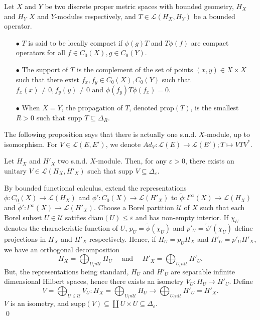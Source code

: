 \begin{definition}
Let $X$ and $Y$ be two discrete proper metric spaces with bounded geometry, $H_X$ and $H_Y$ $X$ and $Y$-modules respectively, and $T\in \mathcal L(H_X, H_Y)$ be a bounded operator.
\begin{itemize}
\item[$\bullet$] $T$ is said to be locally compact if $\phi(g)T$ and $T\phi(f)$ are compact operators for all $f\in C_0(X),g\in C_0(Y)$.
\item[$\bullet$] The support of $T$ is the complement of the set of points $(x,y)\in X\times X$ such that there exist $f_x,f_y\in C_0(X),C_0(Y)$ such that $f_x(x)\neq 0,f_{y}(y)\neq 0$ and $\phi(f_{y}) T \phi(f_x)=0$.
\item[$\bullet$] When $X=Y$, the propagation of $T$, denoted prop$(T)$, is the smallest $R>0$ such that supp $T \subseteq \Delta_R$.
\end{itemize}
\end{definition}

The following proposition says that there is actually one s.n.d. $X$-module, up to isomorphism. For $V\in\mathcal L(E,E')$, we denote $Ad_V : \mathcal L(E) \rightarrow \mathcal L(E') ; T\mapsto VTV^*$.

\begin{prop}\label{SND}
Let $H_X$ and $H'_X$ two s.n.d. $X$-module. Then, for any $\varepsilon>0$, there exists an unitary $V\in\mathcal L(H_X,H'_X)$ such that $\text{supp }V \subseteq \Delta_\varepsilon$.
\end{prop}

\begin{dem}
By bounded functional calculus, extend the representations $\phi : C_0(X)\rightarrow \mathcal L(H_X)$ and $\phi' : C_0(X)\rightarrow \mathcal L(H'_X)$ to $\tilde \phi : l^\infty(X)\rightarrow \mathcal L(H_X) $ and $\tilde \phi' : l^\infty(X)\rightarrow \mathcal L(H'_X) $. Choose a Borel partition $\mathcal U$ of $X$ such that each Borel subset $U\in\mathcal U$ satifies diam$(U)\leq \varepsilon $ and has non-empty interior. If $\chi_U$ denotes the characteristic function of $U$, $p_U = \tilde\phi(\chi_U)$ and $p'_{U}=\tilde\phi'(\chi_U)$ define projections in $H_X$ and $H'_X$ respectively. Hence, if $H_U = p_U H_X$ and $H'_U= p'_U H'_X$, we have an orthogonal decomposition 
\[H_X = \bigoplus_{U_in\mathcal U} H_U \quad  \text{ and } \quad H'_X = \bigoplus_{U_in\mathcal U} H'_U.\]
But, the representations being standard, $H_U$ and $H'_U$ are separable infinite dimensional Hilbert spaces, hence there exists an isometry $V_U : H_U\rightarrow H'_U$. Define 
\[V = \bigoplus_{U\in\mathcal U} V_U : H_X = \bigoplus_{U_in\mathcal U} H_U \rightarrow  \bigoplus_{U_in\mathcal U} H'_U = H'_X.  \]
$V$ is an isometry, and supp$(V)\subseteq \coprod U\times U \subseteq \Delta_\varepsilon$.\\
\qed
\end{dem}

